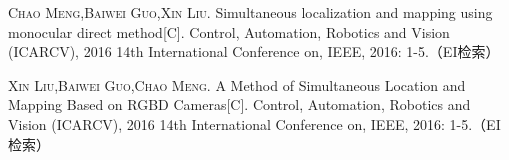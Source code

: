

\begin{publications}{99}

	\item\textsc{Chao Meng,Baiwei Guo,Xin Liu}. {Simultaneous localization and mapping using monocular direct method}[C]. Control, Automation, Robotics and Vision (ICARCV), 2016 14th International Conference on, IEEE, 2016: 1-5.（EI检索）
	
      
	\item\textsc{Xin Liu,Baiwei Guo,Chao Meng}. {A Method of Simultaneous Location and Mapping Based on RGBD Cameras}[C]. Control, Automation, Robotics and Vision (ICARCV), 2016 14th International Conference on, IEEE, 2016: 1-5.（EI检索）

    
\end{publications}